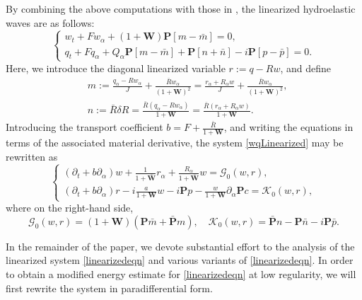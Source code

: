 \documentclass[10pt]{amsart}
\theoremstyle{remark}
\theoremstyle{definition}
\numberwithin{equation}{section}
\newcommand{\p}{\partial}
\newcommand{\al}{\alpha}
\newcommand{\f}{\frac}
\newcommand{\nP}{{\mathbf P}}
\begin{document}
By combining the above computations with those in \cite{MR3667289}, the linearized hydroelastic waves are as follows:
\begin{equation} \label{wqLinearized}
\begin{cases}
w_t+Fw_{\al}+(1+\mathbf{W})\nP[m-\bar{m}]=0,\\
q_t+Fq_{\al}+Q_{\al}\nP[m-\bar{m}]+\nP[n+\bar{n}]-i\nP[p-\bar{p}]=0.
\end{cases}
\end{equation}
Here, we introduce the diagonal linearized variable $r:=q-Rw$, and define
\begin{align*}
&m:=\f{q_{\al}-Rw_{\al}}{J}+\f{\bar{R}w_{\al}}{(1+\mathbf{W})^2}=\f{r_{\al}+R_{\al}w}{J}+\f{\bar{R}w_{\al}}{(1+\mathbf{W})^2}, \\
&n:=\bar{R}\delta R=\f{\bar{R}(q_{\al}-Rw_{\al})}{1+\mathbf{W}}=\frac{\bar{R}(r_{\al}+R_{\al}w)}{1+\mathbf{W}}.
\end{align*}
Introducing the transport coefficient  $b=F+\frac{\bar{R}}{1+\mathbf{W}}$, and writing the equations in terms of the associated material derivative, the system \eqref{wqLinearized} may be rewritten as
\begin{equation} \label{linearizedeqn}
\begin{cases}
(\p_t+b\p_{\al})w+\f{1}{1+\bar{\mathbf{W}}}r_{\al}+\frac{R_{\al}}{1+\bar{\mathbf{W}}}w=\mathcal{G}_0(w,r),\\
(\p_t+b\p_{\al})r-i\frac{a}{1+\mathbf{W}}w-i\nP p-\frac{w}{1+\mathbf{W}}\p_{\al}\nP c=\mathcal{K}_0(w,r),
\end{cases}
\end{equation}
where on the right-hand side,
\begin{equation*}
\mathcal{G}_0(w,r)=(1+\mathbf{W})(\nP\bar{m}+\bar{\nP}m),\quad
\mathcal{K}_0(w,r)=\bar{\nP}n-\nP\bar{n}-i\nP\bar{p}.
\end{equation*}

In the remainder of the paper, we devote substantial effort to the analysis of the linearized system \eqref{linearizedeqn} and various variants of \eqref{linearizedeqn}.
In order to obtain a modified energy estimate for \eqref{linearizedeqn} at low regularity, we will first rewrite the system in paradifferential form.
\end{document}
